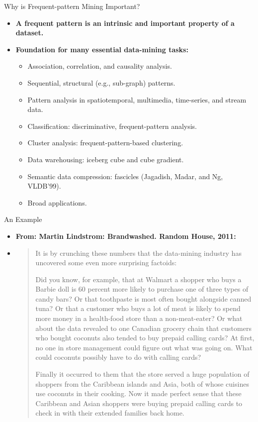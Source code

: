 \begin{frame}{Why is Frequent-pattern Mining Important?}
	\begin{itemize}
		\item \textbf{A frequent pattern is an intrinsic and important property 
		of a dataset.}
		\item \textbf{Foundation for many essential data-mining tasks:}
		\begin{itemize}
			\item Association, correlation, and causality analysis.
			\item Sequential, structural (e.g., sub-graph) patterns.
			\item Pattern analysis in spatiotemporal, multimedia, time-series, 
			and stream data.
			\item Classification: discriminative, frequent-pattern analysis.
			\item Cluster analysis: frequent-pattern-based clustering.
			\item Data warehousing: iceberg cube and cube gradient.
			\item Semantic data compression: fascicles (Jagadish, Madar, and 
			Ng, VLDB'99).
			\item Broad applications.
		\end{itemize}
	\end{itemize}
\end{frame}

\begin{frame}{An Example}
	\begin{itemize}
		\item \textbf{From: Martin Lindstrom: Brandwashed. Random House, 2011:}
		\item \begin{quote}
			It is by crunching these numbers that the data-mining industry has 
			uncovered some even more surprising factoids:
			
			Did you know, for example, that at Walmart a shopper who buys a 
			Barbie doll is 60 percent more likely to purchase one of three 
			types of candy bars? Or that toothpaste is most often bought 
			alongside canned tuna? Or that a customer who buys a lot of meat is 
			likely to spend more money in a health-food store than a 
			non-meat-eater? Or what about the data revealed to one Canadian 
			grocery chain that customers who bought coconuts also tended to buy 
			prepaid calling cards? At first, no one in store management could 
			figure out what was going on. What could coconuts possibly have to 
			do with calling cards?
			
			Finally it occurred to them that the store served a huge population 
			of shoppers from the Caribbean islands and Asia, both of whose 
			cuisines use coconuts in their cooking. Now it made perfect sense 
			that these Caribbean and Asian shoppers were buying prepaid calling 
			cards to check in with their extended families back home.
		\end{quote}
	\end{itemize}
\end{frame}

